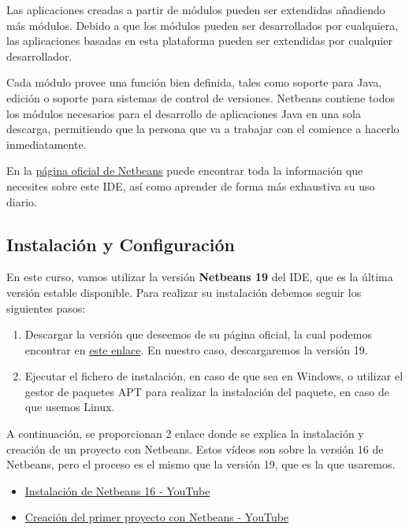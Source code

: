 Las aplicaciones creadas a partir de módulos pueden ser extendidas añadiendo más módulos. Debido a que los módulos pueden ser desarrollados por cualquiera, las aplicaciones basadas en esta plataforma pueden ser extendidas por cualquier desarrollador.

Cada módulo provee una función bien definida, tales como soporte para Java, edición o soporte para sistemas de control de versiones. Netbeans contiene todos los módulos necesarios para el desarrollo de aplicaciones Java en una sola descarga, permitiendo que la persona que va a trabajar con el comience a hacerlo inmediatamente.

En la \href{https://netbeans.apache.org/}{página oficial de Netbeans} puede encontrar toda la información que necesites sobre este IDE, así como aprender de forma más exhaustiva su uso diario.

\subsection{Instalación y Configuración}
En este curso, vamos utilizar la versión \textbf{Netbeans 19} del IDE, que es la última versión estable disponible. Para realizar su instalación debemos seguir los siguientes pasos:

\begin{enumerate}
    \item Descargar la versión que deseemos de su página oficial, la cual podemos encontrar en \href{https://netbeans.apache.org/download/index.html}{este enlace}. En nuestro caso, descargaremos la versión 19.
    \item Ejecutar el fichero de instalación, en caso de que sea en Windows, o utilizar el gestor de paquetes APT para realizar la instalación del paquete, en caso de que usemos Linux.
\end{enumerate}

A continuación, se proporcionan 2 enlace donde se explica la instalación y creación de un proyecto con Netbeans. Estos vídeos son sobre la versión 16 de Netbeans, pero el proceso es el mismo que la versión 19, que es la que usaremos.

\begin{itemize}
    \item \href{https://www.youtube.com/watch?v=7c-JgO7QhMY&t=1s}{Instalación de Netbeans 16 - YouTube}
    \item \href{https://www.youtube.com/watch?v=AxAJdvikdtk}{Creación del primer proyecto con Netbeans - YouTube}
\end{itemize}

